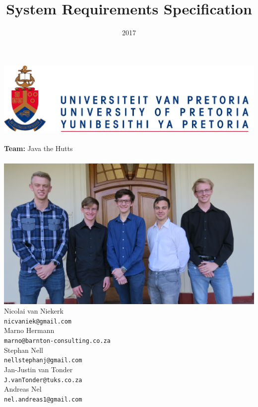 \documentclass{article}
\title{System Requirements Specification}
\date{2017}
\begin{document}
\makeatletter
    \begin{titlepage}
        \begin{center}
            \includegraphics[width=0.7\linewidth]{img/up.png}\\[4ex]
            {\huge \bfseries \@title }\\[2ex]
            {\LARGE \textbf{Team:} Java the Hutts}\\[2ex]
            {\LARGE \@date}\\[2ex]
            {\includegraphics[width=\linewidth]{img/team_photo.jpg}}\\[2ex]
            {\large  Nicolai van Niekerk\\ \texttt{nicvaniek@gmail.com}}\\[2ex]
            {\large  Marno Hermann\\ \texttt{marno@barnton-consulting.co.za}}\\[2ex]
            {\large  Stephan Nell\\ \texttt{nellstephanj@gmail.com}}\\[2ex]
            {\large  Jan-Justin van Tonder\\ \texttt{J.vanTonder@tuks.co.za}}\\[2ex]
            {\large  Andreas Nel\\ \texttt{nel.andreas1@gmail.com}}\\[2ex]
        \end{center}
        
    \end{titlepage}
\makeatother
\end{document}
